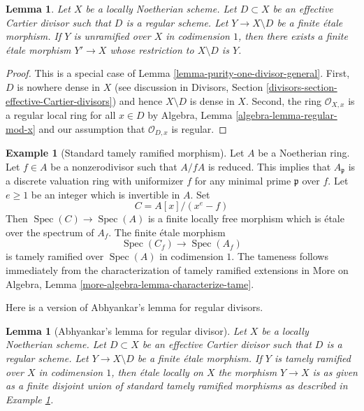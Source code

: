 \documentclass{stacks-project}
\theoremstyle{plain}
\newtheorem{lemma}[subsection]{Lemma}
\theoremstyle{definition}
\newtheorem{example}[subsection]{Example}
\theoremstyle{remark}
\numberwithin{equation}{subsection}
\def\Spec{\mathop{\mathrm{Spec}}}
\begin{document}
\begin{lemma}
\label{lemma-purity-one-divisor}
Let $X$ be a locally Noetherian scheme. Let $D \subset X$
be an effective Cartier divisor such that $D$ is a regular scheme.
Let $Y \to X \setminus D$ be a finite \'etale morphism.
If $Y$ is unramified over $X$ in codimension $1$, then
there exists a finite \'etale morphism $Y' \to X$
whose restriction to $X \setminus D$ is $Y$.
\end{lemma}

\begin{proof}
This is a special case of Lemma \ref{lemma-purity-one-divisor-general}.
First, $D$ is nowhere dense in $X$ (see discussion in
Divisors, Section \ref{divisors-section-effective-Cartier-divisors})
and hence $X \setminus D$ is dense in $X$. Second, the ring
$\mathcal{O}_{X, x}$ is a regular local ring for all $x \in D$ by
Algebra, Lemma \ref{algebra-lemma-regular-mod-x}
and our assumption that $\mathcal{O}_{D, x}$ is regular.
\end{proof}

\begin{example}[Standard tamely ramified morphism]
\label{example-tamely-ramified}
Let $A$ be a Noetherian ring. Let $f \in A$ be a nonzerodivisor
such that $A/fA$ is reduced. This implies that $A_\mathfrak p$
is a discrete valuation ring with uniformizer $f$ for any
minimal prime $\mathfrak p$ over $f$. Let $e \geq 1$ be an integer which
is invertible in $A$. Set
$$
C = A[x]/(x^e - f)
$$
Then $\Spec(C) \to \Spec(A)$ is a finite locally free morphism
which is \'etale over the spectrum of $A_f$. The finite \'etale morphism
$$
\Spec(C_f) \longrightarrow \Spec(A_f)
$$
is tamely ramified over $\Spec(A)$ in codimension $1$. The
tameness follows immediately from the characterization of tamely ramified
extensions in
More on Algebra, Lemma \ref{more-algebra-lemma-characterize-tame}.
\end{example}

\noindent
Here is a version of Abhyankar's lemma for regular divisors.

\begin{lemma}[Abhyankar's lemma for regular divisor]
\label{lemma-abhyankar-one-divisor}
Let $X$ be a locally Noetherian scheme. Let $D \subset X$
be an effective Cartier divisor such that $D$ is a regular scheme.
Let $Y \to X \setminus D$ be a finite \'etale morphism.
If $Y$ is tamely ramified over $X$ in codimension $1$, then
\'etale locally on $X$ the morphism $Y \to X$ is as given
as a finite disjoint union of standard tamely ramified
morphisms as described in Example \ref{example-tamely-ramified}.
\end{lemma}
\end{document}
